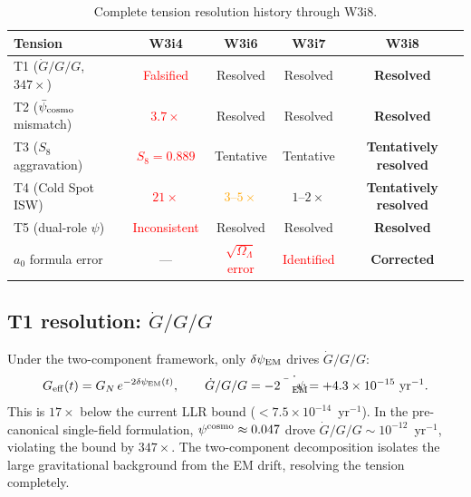 \documentclass[11pt]{article}
\newcommand{\ee}[1]{\times 10^{#1}}
\newcommand{\dpsiEM}{\delta\psi_{\rm EM}}
\newcommand{\psicosmo}{\bar{\psi}_{\rm cosmo}}
\newcommand{\psiEM}{\bar{\psi}_{\rm EM}}
\newcommand{\GN}{G_N}
\newcommand{\Geff}{G_{\rm eff}}
\newcommand{\Gdot}{\dot{G}/G}
\newcommand{\aM}{a_0}
\newcommand{\OmL}{\Omega_\Lambda}
\begin{document}
\begin{table}[H]
\centering
\caption{Complete tension resolution history through W3i8.}
\label{tab:tension-history}
\begin{tabular}{lcccc}
\toprule
\textbf{Tension} & \textbf{W3i4} & \textbf{W3i6} & \textbf{W3i7}
& \textbf{W3i8} \\
\midrule
T1 ($\Gdot/G$, $347\times$) &
  \textcolor{red}{Falsified} &
  \textcolor{green!50!black}{Resolved} &
  \textcolor{green!50!black}{Resolved} &
  \textcolor{green!50!black}{\textbf{Resolved}} \\
\addlinespace
T2 ($\psicosmo$ mismatch) &
  \textcolor{red}{$3.7\times$} &
  \textcolor{green!50!black}{Resolved} &
  \textcolor{green!50!black}{Resolved} &
  \textcolor{green!50!black}{\textbf{Resolved}} \\
\addlinespace
T3 ($S_8$ aggravation) &
  \textcolor{red}{$S_8 = 0.889$} &
  \textcolor{green!50!black}{Tentative} &
  \textcolor{green!50!black}{Tentative} &
  \textcolor{green!50!black}{\textbf{Tentatively resolved}} \\
\addlinespace
T4 (Cold Spot ISW) &
  \textcolor{red}{$21\times$} &
  \textcolor{orange}{$3$--$5\times$} &
  \textcolor{green!50!black}{$1$--$2\times$} &
  \textcolor{green!50!black}{\textbf{Tentatively resolved}} \\
\addlinespace
T5 (dual-role $\psi$) &
  \textcolor{red}{Inconsistent} &
  \textcolor{green!50!black}{Resolved} &
  \textcolor{green!50!black}{Resolved} &
  \textcolor{green!50!black}{\textbf{Resolved}} \\
\addlinespace
$\aM$ formula error &
  --- & \textcolor{red}{$\sqrt{\OmL}$ error} &
  \textcolor{red}{Identified} &
  \textcolor{green!50!black}{\textbf{Corrected}} \\
\bottomrule
\end{tabular}
\end{table}

\subsection{T1 resolution: $\Gdot/G$}

Under the two-component framework, only $\dpsiEM$ drives $\Gdot/G$:
\begin{equation}
\Geff(t) = \GN\,e^{-2\dpsiEM(t)}, \qquad
\Gdot/G = -2\dot{\psiEM} = +4.3\ee{-15}~\text{yr}^{-1}.
\end{equation}
This is $17\times$ below the current LLR bound ($< 7.5\ee{-14}$~yr$^{-1}$).
In the pre-canonical single-field formulation, $\psi^{\rm cosmo} \approx 0.047$
drove $\Gdot/G \sim 10^{-12}$~yr$^{-1}$, violating the bound by $347\times$.
The two-component decomposition isolates the large gravitational background
from the EM drift, resolving the tension completely.
\end{document}

